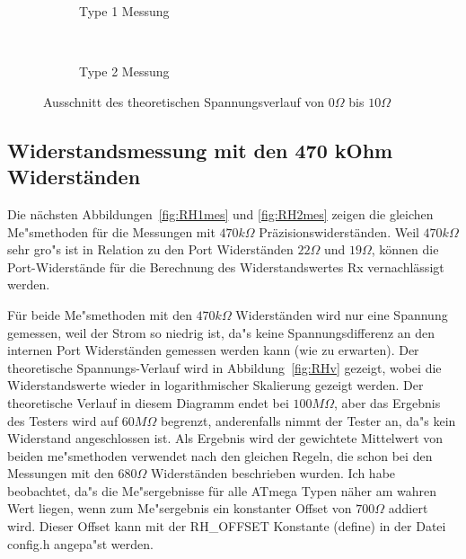 \begin{figure}[H]
  \begin{subfigure}[b]{9cm}
    \centering
    \resizebox{9cm}{!}{}
    \caption{Type 1 Messung}
    \label{fig:RLvlow}
  \end{subfigure}
  ~
  \begin{subfigure}[b]{9cm}
    \centering
    \resizebox{9cm}{!}{}
    \caption{Type 2 Messung}
    \label{fig:RLvhigh}
  \end{subfigure}
  \caption{Ausschnitt des theoretischen Spannungsverlauf von \(0\Omega\) bis \(10\Omega\)}
\end{figure}


\subsection{Widerstandsmessung mit den 470 kOhm Widerst\"anden}
Die n\"achsten Abbildungen~\ref{fig:RH1mes} und \ref{fig:RH2mes} zeigen die gleichen Me"smethoden f\"ur die Messungen mit
 \(470k\Omega\) Pr\"azisionswiderst\"anden.
Weil \(470k\Omega\) sehr gro"s ist in Relation zu den Port Widerst\"anden \(22\Omega\) und \(19\Omega\), 
k\"onnen die Port-Widerst\"ande f\"ur die Berechnung des Widerstandswertes Rx vernachl\"assigt werden.

F\"ur beide Me"smethoden mit den \(470k\Omega\) Widerst\"anden wird nur eine Spannung gemessen, weil der Strom
so niedrig ist, da"s keine Spannungsdifferenz an den internen Port Widerst\"anden gemessen werden kann (wie zu erwarten).
Der theoretische Spannungs-Verlauf wird in Abbildung~\ref{fig:RHv} gezeigt, wobei die Widerstandswerte wieder in
logarithmischer Skalierung gezeigt werden.
Der theoretische Verlauf in diesem Diagramm endet bei \(100M\Omega\), aber das Ergebnis des Testers wird auf
 \(60M\Omega\) begrenzt, anderenfalls nimmt der Tester an, da"s kein Widerstand angeschlossen ist.
Als Ergebnis wird der gewichtete Mittelwert von beiden me"smethoden verwendet nach den gleichen Regeln, die schon bei
den Messungen mit den  \(680\Omega\) Widerst\"anden beschrieben wurden.
Ich habe beobachtet, da"s die Me"sergebnisse f\"ur alle ATmega Typen  n\"aher am wahren Wert liegen, wenn zum Me"sergebnis
ein konstanter Offset von \(700\Omega\) addiert wird.
Dieser Offset kann mit der RH\_OFFSET Konstante (define) in der Datei config.h angepa"st werden.

